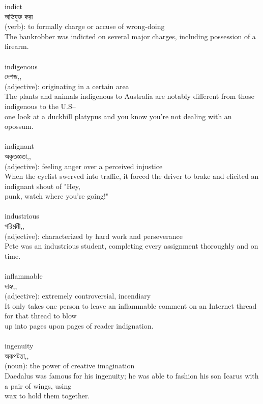 \documentclass{article}
\begin{document}
{indict}\\
{অভিযুক্ত করা}\\
{(verb): to formally charge or accuse of wrong-doing\\The bankrobber was indicted on several major charges, including possession of a firearm.\\}\\
{indigenous}\\
{দেশজ,,}\\
{(adjective): originating in a certain area\\The plants and animals indigenous to Australia are notably different from those indigenous to the U.S--\\one look at a duckbill platypus and you know you're not dealing with an opossum.\\}\\
{indignant}\\
{অকৃতজ্ঞতা,,}\\
{(adjective): feeling anger over a perceived injustice\\When the cyclist swerved into traffic, it forced the driver to brake and elicited an indignant shout of "Hey,\\punk, watch where you're going!"\\}\\
{industrious}\\
{পরিশ্রমী,,}\\
{(adjective): characterized by hard work and perseverance\\Pete was an industrious student, completing every assignment thoroughly and on time.\\}\\
{inflammable}\\
{দাহ্য,,}\\
{(adjective): extremely controversial, incendiary\\It only takes one person to leave an inflammable comment on an Internet thread for that thread to blow\\up into pages upon pages of reader indignation.\\}\\
{ingenuity}\\
{অকপটতা,,}\\
{(noun): the power of creative imagination\\Daedalus was famous for his ingenuity; he was able to fashion his son Icarus with a pair of wings, using\\wax to hold them together.\\}\\
\end{document}
